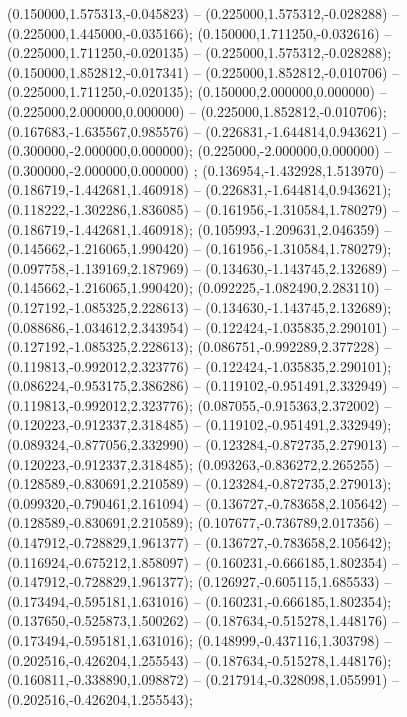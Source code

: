  (0.150000,1.575313,-0.045823) -- (0.225000,1.575312,-0.028288) -- (0.225000,1.445000,-0.035166);
 (0.150000,1.711250,-0.032616) -- (0.225000,1.711250,-0.020135) -- (0.225000,1.575312,-0.028288);
 (0.150000,1.852812,-0.017341) -- (0.225000,1.852812,-0.010706) -- (0.225000,1.711250,-0.020135);
 (0.150000,2.000000,0.000000) -- (0.225000,2.000000,0.000000) -- (0.225000,1.852812,-0.010706);
 (0.167683,-1.635567,0.985576) -- (0.226831,-1.644814,0.943621) -- (0.300000,-2.000000,0.000000);
 (0.225000,-2.000000,0.000000) -- (0.300000,-2.000000,0.000000) ;
 (0.136954,-1.432928,1.513970) -- (0.186719,-1.442681,1.460918) -- (0.226831,-1.644814,0.943621);
 (0.118222,-1.302286,1.836085) -- (0.161956,-1.310584,1.780279) -- (0.186719,-1.442681,1.460918);
 (0.105993,-1.209631,2.046359) -- (0.145662,-1.216065,1.990420) -- (0.161956,-1.310584,1.780279);
 (0.097758,-1.139169,2.187969) -- (0.134630,-1.143745,2.132689) -- (0.145662,-1.216065,1.990420);
 (0.092225,-1.082490,2.283110) -- (0.127192,-1.085325,2.228613) -- (0.134630,-1.143745,2.132689);
 (0.088686,-1.034612,2.343954) -- (0.122424,-1.035835,2.290101) -- (0.127192,-1.085325,2.228613);
 (0.086751,-0.992289,2.377228) -- (0.119813,-0.992012,2.323776) -- (0.122424,-1.035835,2.290101);
 (0.086224,-0.953175,2.386286) -- (0.119102,-0.951491,2.332949) -- (0.119813,-0.992012,2.323776);
 (0.087055,-0.915363,2.372002) -- (0.120223,-0.912337,2.318485) -- (0.119102,-0.951491,2.332949);
 (0.089324,-0.877056,2.332990) -- (0.123284,-0.872735,2.279013) -- (0.120223,-0.912337,2.318485);
 (0.093263,-0.836272,2.265255) -- (0.128589,-0.830691,2.210589) -- (0.123284,-0.872735,2.279013);
 (0.099320,-0.790461,2.161094) -- (0.136727,-0.783658,2.105642) -- (0.128589,-0.830691,2.210589);
 (0.107677,-0.736789,2.017356) -- (0.147912,-0.728829,1.961377) -- (0.136727,-0.783658,2.105642);
 (0.116924,-0.675212,1.858097) -- (0.160231,-0.666185,1.802354) -- (0.147912,-0.728829,1.961377);
 (0.126927,-0.605115,1.685533) -- (0.173494,-0.595181,1.631016) -- (0.160231,-0.666185,1.802354);
 (0.137650,-0.525873,1.500262) -- (0.187634,-0.515278,1.448176) -- (0.173494,-0.595181,1.631016);
 (0.148999,-0.437116,1.303798) -- (0.202516,-0.426204,1.255543) -- (0.187634,-0.515278,1.448176);
 (0.160811,-0.338890,1.098872) -- (0.217914,-0.328098,1.055991) -- (0.202516,-0.426204,1.255543);

